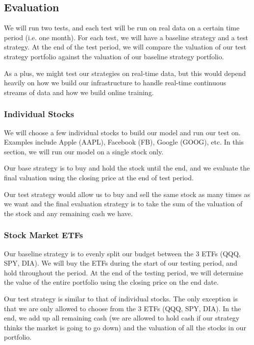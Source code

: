 \documentclass[10pt]{article}
\begin{document}
\subsection{Evaluation}

We will run two tests, and each test will be run on real data on a certain time period (i.e. one month). For each test, we will have a baseline strategy and a test strategy. At the end of the test period, we will compare the valuation of our test strategy portfolio against the valuation of our baseline strategy portfolio.

As a plus, we might test our strategies on real-time data, but this would depend heavily on how we build our infrastructure to handle real-time continuous streams of data and how we build online training.

\subsubsection{Individual Stocks}

We will choose a few individual stocks to build our model and run our test on. Examples include Apple (AAPL), Facebook (FB), Google (GOOG), etc. In this section, we will run our model on a single stock only. 

Our base strategy is to buy and hold the stock until the end, and we evaluate the final valuation using the closing price at the end of test period.

Our test strategy would allow us to buy and sell the same stock as many times as we want and the final evaluation strategy is to take the sum of the valuation of the stock and any remaining cash we have.

\subsubsection{Stock Market ETFs}

Our baseline strategy is to evenly split our budget between the 3 ETFs (QQQ, SPY, DIA). We will buy the ETFs during the start of our testing period, and hold throughout the period. At the end of the testing period, we will determine the value of the entire portfolio using the closing price on the end date.

Our test strategy is similar to that of individual stocks. The only exception is that we are only allowed to choose from the 3 ETFs (QQQ, SPY, DIA). In the end, we add up all remaining cash (we are allowed to hold cash if our strategy thinks the market is going to go down) and the valuation of all the stocks in our portfolio.
\end{document}
